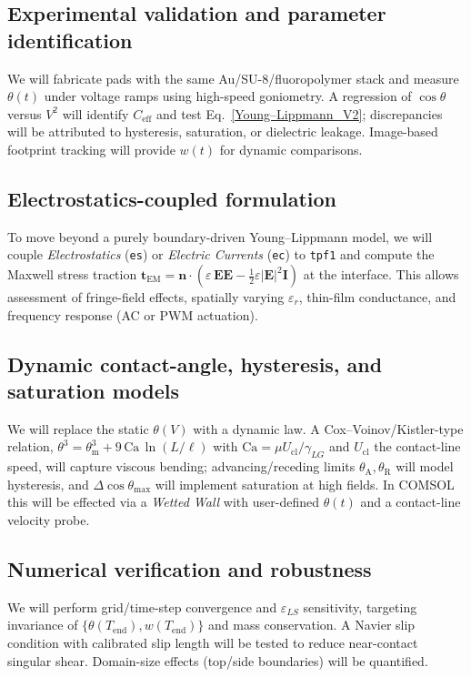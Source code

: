 \documentclass[9pt,a4paper,twocolumn,twoside]{tau-class/tau}
\begin{document}
\subsection{Experimental validation and parameter identification}
We will fabricate pads with the same Au/SU-8/fluoropolymer stack and measure $\theta(t)$ under voltage ramps using high-speed goniometry. A regression of $\cos\theta$ versus $V^2$ will identify $C_{\mathrm{eff}}$ and test Eq.~\eqref{Young–Lippmann_V2}; discrepancies will be attributed to hysteresis, saturation, or dielectric leakage. Image-based footprint tracking will provide $w(t)$ for dynamic comparisons.

\subsection{Electrostatics-coupled formulation}
To move beyond a purely boundary-driven Young–Lippmann model, we will couple \textit{Electrostatics} (\texttt{es}) or \textit{Electric Currents} (\texttt{ec}) to \texttt{tpf1} and compute the Maxwell stress traction $\mathbf{t}_\mathrm{EM}=\mathbf{n}\!\cdot\!(\varepsilon\,\mathbf{E}\mathbf{E} -\tfrac12\varepsilon |\mathbf{E}|^2\mathbf{I})$ at the interface. This allows assessment of fringe-field effects, spatially varying $\varepsilon_r$, thin-film conductance, and frequency response (AC or PWM actuation).

\subsection{Dynamic contact-angle, hysteresis, and saturation models}
We will replace the static $\theta(V)$ with a dynamic law. A Cox–Voinov/Kistler-type relation, $\theta^3=\theta_{\mathrm{m}}^3+9\,\mathrm{Ca}\,\ln(L/\ell)$ with $\mathrm{Ca}=\mu U_{\mathrm{cl}}/\gamma_{LG}$ and $U_{\mathrm{cl}}$ the contact-line speed, will capture viscous bending; advancing/receding limits $\theta_{\mathrm{A}},\theta_{\mathrm{R}}$ will model hysteresis, and $\Delta\cos\theta_{\max}$ will implement saturation at high fields. In COMSOL this will be effected via a \textit{Wetted Wall} with user-defined $\theta(t)$ and a contact-line velocity probe.

\subsection{Numerical verification and robustness}
We will perform grid/time-step convergence and $\varepsilon_{LS}$ sensitivity, targeting invariance of $\{\theta(T_{\mathrm{end}}),w(T_{\mathrm{end}})\}$ and mass conservation. A Navier slip condition with calibrated slip length will be tested to reduce near-contact singular shear. Domain-size effects (top/side boundaries) will be quantified.
\end{document}
